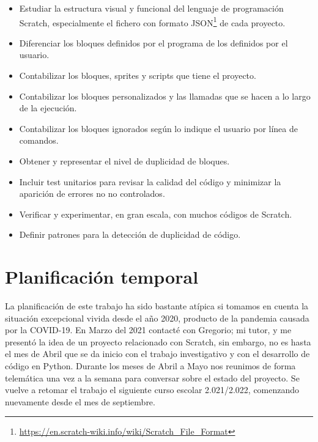 \documentclass[a4paper, 12pt]{book}
\begin{document}
\begin{itemize}
  	\item Estudiar la estructura visual y funcional del lenguaje de programación Scratch, especialmente el fichero con formato JSON\footnote{\url{https://en.scratch-wiki.info/wiki/Scratch_File_Format}} de cada proyecto.
  	\item Diferenciar los bloques definidos por el programa de los definidos por el usuario.
  	\item Contabilizar los bloques, sprites y scripts que tiene el proyecto.
  	\item Contabilizar los bloques personalizados y las llamadas que se hacen a lo largo de la ejecución.
  	\item Contabilizar los bloques ignorados según lo indique el usuario por línea de comandos.
  	\item Obtener y representar el nivel de duplicidad de bloques. 	
 	\item Incluir test unitarios para revisar la calidad del código y minimizar la aparición de errores no no controlados.  	
	\item Verificar y experimentar, en gran escala, con muchos códigos de Scratch.
	\item Definir patrones para la detección de duplicidad de código.
\end{itemize}

\section{Planificación temporal}
\label{sec:planificacion-temporal}


La planificación de este trabajo ha sido bastante atípica si tomamos en cuenta la situación excepcional vivida desde el año 2020, producto de la pandemia causada por la COVID-19. En Marzo del 2021 contacté con Gregorio; mi tutor, y me presentó la idea de un proyecto relacionado con Scratch, sin embargo, no es hasta el mes de Abril que se da inicio con el trabajo investigativo y con el desarrollo de código en Python. Durante los meses de Abril a Mayo nos reunimos de forma telemática una vez a la semana para conversar sobre el estado del proyecto. Se vuelve a retomar el trabajo el siguiente curso escolar 2.021/2.022, comenzando nuevamente desde el mes de septiembre.
\end{document}
